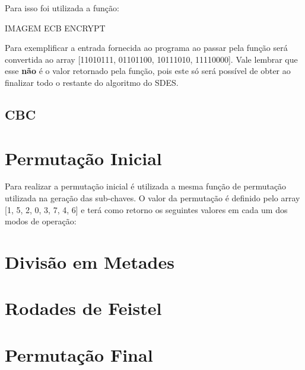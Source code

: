 \documentclass[12pt]{article}
\begin{document}
Para isso foi utilizada a função:

IMAGEM ECB ENCRYPT

Para exemplificar a entrada fornecida ao programa ao passar pela função será convertida ao array [11010111, 01101100, 10111010, 11110000]. Vale lembrar que esse \textbf{não} é o valor retornado pela função, pois este só será possível de obter ao finalizar todo o restante do algoritmo do SDES.


\subsection{CBC}

\section{Permutação Inicial}
Para realizar a permutação inicial é utilizada a mesma função de permutação utilizada na geração das sub-chaves. O valor da permutação é definido pelo array [1, 5, 2, 0, 3, 7, 4, 6] e terá como retorno os seguintes valores em cada um dos modos de operação:


\section{Divisão em Metades}

\section{Rodades de Feistel}

\section{Permutação Final}
\end{document}
